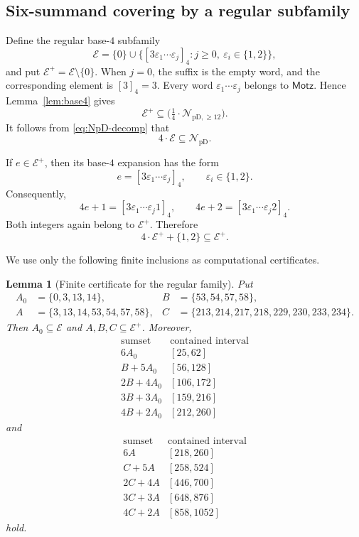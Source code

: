 \documentclass[12pt]{article}
\theoremstyle{plain}
\newtheorem{lemma}[theorem]{Lemma}
\theoremstyle{definition}
\theoremstyle{plain}
\newcommand{\NpD}{\mathcal{N}_{\mathrm{pD}}}
\newcommand{\Pset}{%
  \bigl(\tfrac{1}{4}\cdot\mathcal{N}_{\mathrm{pD},\geq 12}\bigr)%
}
\begin{document}
\subsection{Six-summand covering by a regular subfamily}

Define the regular base-$4$ subfamily
\[
 \mathcal E=\{0\}\cup
 \bigl\{[3\varepsilon_1\cdots\varepsilon_j]_4:
        j\geq0,\ \varepsilon_i\in\{1,2\}\bigr\},
\]
and put $\mathcal E^+=\mathcal E\setminus\{0\}$.  When $j=0$, the
suffix is the empty word, and the corresponding element is $[3]_4=3$.
Every word $\varepsilon_1\cdots\varepsilon_j$ belongs to
$\mathsf{Motz}$.  Hence Lemma~\ref{lem:base4} gives
\[
 \mathcal E^+\subseteq\Pset.
\]
It follows from \eqref{eq:NpD-decomp} that
\begin{equation}\label{eq:4E}
 4\cdot\mathcal E\subseteq\NpD.
\end{equation}

If $e\in\mathcal E^+$, then its base-$4$ expansion has the form
\[
 e=[3\varepsilon_1\cdots\varepsilon_j]_4,
 \qquad \varepsilon_i\in\{1,2\}.
\]
Consequently,
\[
 4e+1=[3\varepsilon_1\cdots\varepsilon_j1]_4,
 \qquad
 4e+2=[3\varepsilon_1\cdots\varepsilon_j2]_4.
\]
Both integers again belong to $\mathcal E^+$.  Therefore
\begin{equation}\label{eq:Eclosure}
 4\cdot\mathcal E^++\{1,2\}\subseteq\mathcal E^+.
\end{equation}

We use only the following finite inclusions as computational certificates.

\begin{lemma}[Finite certificate for the regular family]
\label{lem:Ecertificate}
Put
\[
\begin{aligned}
 A_0&=\{0,3,13,14\},
 &B&=\{53,54,57,58\},\\
 A&=\{3,13,14,53,54,57,58\},
 &C&=\{213,214,217,218,229,230,233,234\}.
\end{aligned}
\]
Then $A_0\subseteq\mathcal E$ and $A,B,C\subseteq\mathcal E^+$.
Moreover,
\begin{equation}\label{eq:E-small-certificate}
\begin{array}{c|c}
\text{sumset}&\text{contained interval}\\ \hline
6A_0 &[25,62]\\
B+5A_0 &[56,128]\\
2B+4A_0 &[106,172]\\
3B+3A_0 &[159,216]\\
4B+2A_0 &[212,260]
\end{array}
\end{equation}
and
\begin{equation}\label{eq:E-tail-certificate}
\begin{array}{c|c}
\text{sumset}&\text{contained interval}\\ \hline
6A &[218,260]\\
C+5A &[258,524]\\
2C+4A &[446,700]\\
3C+3A &[648,876]\\
4C+2A &[858,1052]
\end{array}
\end{equation}
hold.
\end{lemma}
\end{document}

